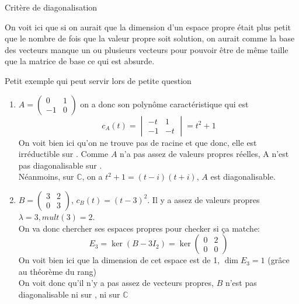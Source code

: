 \begin{parag}{Critère de diagonalisation}
\begin{theoreme}
    \end{theoreme}
    \begin{framedremark}
            On voit ici que si on aurait que la dimension d'un espace propre était plus petit que le nombre de fois que la valeur propre soit solution, on aurait comme la base des vecteurs manque un ou plusieurs vecteurs pour pouvoir être de même taille que la matrice de base ce qui est absurde.
        \end{framedremark}
        \begin{subparag}{Petit exemple qui peut servir lors de petite question}
        \begin{enumerate}
            \item $A = \begin{pmatrix}
                0 & 1\\ -1 & 0
            \end{pmatrix}$ on a donc son polynôme caractéristique qui est 
            \[c_A(t) = \begin{vmatrix}
                -t & 1\\ -1 & -t
            \end{vmatrix} = t^2 + 1\]
            On voit bien ici qu'on ne trouve pas de racine et que donc, elle est irréductible sur \R. Comme $A$ n'a pas assez de valeurs propres réelles, A n'est pas diagonalisable sur \R.
            \\
            Néanmoins, sur $\mathbb{C}$, on a $t^2 + 1 = (t-i)(t+i)$, $A$ est diagonalisable.
            \item $B = \begin{pmatrix}
                3 & 2\\0 & 3
            \end{pmatrix}$, $c_B(t) = (t-3)^2$. Il y a assez de valeurs propres $\lambda = 3, mult(3) = 2$.
            \\
            On va donc chercher ses espaces propres pour checker si ça matche:
            \[E_3 =\ker(B - 3I_2) =  \ker \begin{pmatrix}
                0 & 2\\ 0 & 0
            \end{pmatrix}\]
            On voit bien ici que la dimension de cet espace est de 1, $\dim E_3 = 1$ (grâce au théorème du rang)\\
            On voit donc qu'il n'y a pas assez de vecteurs propres, $B$ n'est pas diagonalisable ni sur \R, ni sur $\mathbb{C}$
        \end{enumerate}
    
            
        \end{subparag}
\end{parag}

